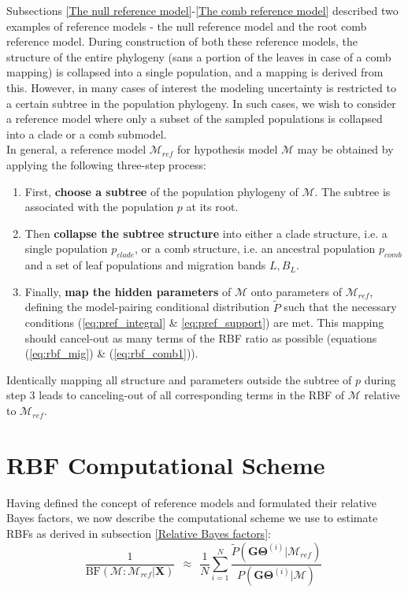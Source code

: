 \documentclass[11pt]{article}
\newcommand{\vect}[1]{\boldsymbol{\mathbf{#1}}}
\newcommand{\X}{\vect{X}}
\newcommand{\M}{\mathcal{M}}
\newcommand{\G}{\vect{G}}
\newcommand{\T}{\vect{\Theta}}
\newcommand{\GT}{\G\T}
\newcommand{\Mref}{\M_{ref}}
\newcommand{\Pref}{\widetilde{P}}
\newcommand{\rbf}{\text{BF}}
\newcommand{\1}{\mathbbm{1}}
\begin{document}
Subsections \ref{The null reference model}-\ref{The comb reference model} described two examples of reference models - the null reference model and the root comb reference model. 
%
During construction of both these reference models, the structure of the entire phylogeny (sans a portion of the leaves in case of a comb mapping) is collapsed into a single population, and a mapping is derived from this.
%
However, in many cases of interest the modeling uncertainty is restricted to a certain subtree in the population phylogeny.
%
In such cases, we wish to consider a reference model where only a subset of the sampled populations is collapsed into a clade or a comb submodel.\\
%
In general, a reference model $\Mref$ for hypothesis model $\M$ may be obtained by applying the following three-step process:

\begin{enumerate}
\item First, \textbf{choose a subtree} of the population phylogeny of $\M$. The subtree is associated with the population $p$ at its root. 

\item Then \textbf{collapse the subtree structure} into either a clade structure, i.e. a single population $p_{clade}$, or a comb structure, i.e. an ancestral population $p_{comb}$ and a set of leaf populations and migration bands $L, B_L$. 

\item Finally, \textbf{map the hidden parameters} of $\M$ onto parameters of $\Mref$, defining the model-pairing conditional distribution $\Pref$ such that the necessary conditions (\ref{eq:pref_integral} \& \ref{eq:pref_support}) are met. This mapping should cancel-out as many terms of the RBF ratio as possible (equations (\ref{eq:rbf_mig}) \& (\ref{eq:rbf_comb1})).
\end{enumerate}

Identically mapping all structure and parameters outside the subtree of $p$ during step 3 leads to canceling-out of all corresponding terms in the RBF of $\M$ relative to $\Mref$.

\section{RBF Computational Scheme} \label{sec:RBF Computational Scheme}

Having defined the concept of reference models and formulated their relative Bayes factors, we now describe the computational scheme we use to estimate RBFs as derived in subsection \ref{Relative Bayes factors}:
%
\begin{equation}
\label{eq:computational_scheme}
 \frac{1}{\rbf(\M:\Mref|\X)}  ~~\approx~~ \frac{1}{N} \sum_{i=1}^{N}\frac{\Pref(\GT^{(i)}|\Mref) }{P(\GT^{(i)}|\M)} ~ 
\end{equation}
\end{document}
